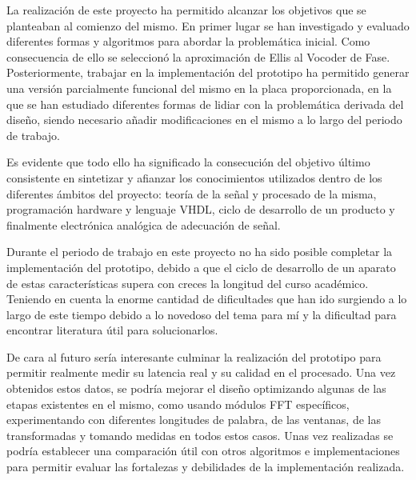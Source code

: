 La realización de este proyecto ha permitido alcanzar los objetivos que se planteaban al comienzo del mismo. En primer lugar se han investigado y evaluado diferentes formas y algoritmos para abordar la problemática inicial. Como consecuencia de ello se seleccionó la aproximación de Ellis al Vocoder de Fase. Posteriormente, trabajar en la implementación del prototipo ha permitido generar una versión parcialmente funcional del mismo en la placa proporcionada, en la que se han estudiado diferentes formas de lidiar con la problemática derivada del diseño, siendo necesario añadir modificaciones en el mismo a lo largo del periodo de trabajo. 

Es evidente que todo ello ha significado la consecución del objetivo último consistente en sintetizar y afianzar los conocimientos utilizados dentro de los diferentes ámbitos del proyecto: teoría de la señal y procesado de la misma, programación hardware y lenguaje VHDL, ciclo de desarrollo de un producto y finalmente electrónica analógica de adecuación de señal.

Durante el periodo de trabajo en este proyecto no ha sido posible completar la implementación del prototipo, debido a que el ciclo de desarrollo de un aparato de estas características supera con creces la longitud del curso académico. Teniendo en cuenta la enorme cantidad de dificultades que han ido surgiendo a lo largo de este tiempo debido a lo novedoso del tema para mí y la dificultad para encontrar literatura útil para solucionarlos.

De cara al futuro sería interesante culminar la realización del prototipo para permitir realmente medir su latencia real y su calidad en el procesado. Una vez obtenidos estos datos, se podría mejorar el diseño optimizando algunas de las etapas existentes en el mismo, como usando módulos FFT específicos, experimentando con diferentes longitudes de palabra, de las ventanas, de las transformadas y tomando medidas en todos estos casos. Unas vez realizadas se podría establecer una comparación útil con otros algoritmos e implementaciones para permitir evaluar las fortalezas y debilidades de la implementación realizada.